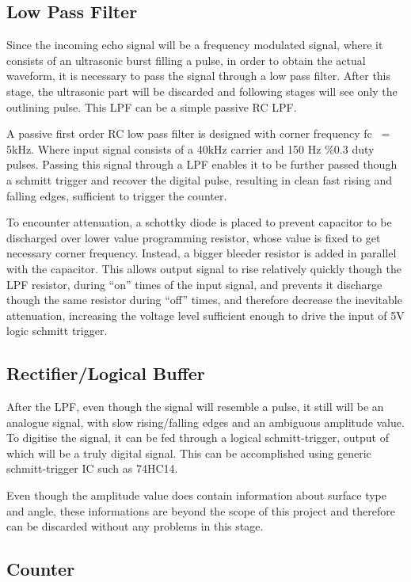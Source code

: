 \documentclass[12pt, a4paper]{article}
\begin{document}
	
	\subsection{Low Pass Filter}
	Since the incoming echo signal will be a frequency modulated signal, where it consists of an ultrasonic burst filling a pulse, in order to obtain the actual waveform, it is necessary to pass the signal through a low pass filter. After this stage, the ultrasonic part will be discarded and following stages will see only the outlining pulse. This LPF can be a simple passive RC LPF.
	
	A passive first order RC low pass filter is designed with corner frequency fc ~= 5kHz. Where input signal consists of a 40kHz carrier and 150 Hz \%0.3 duty pulses. Passing this signal through a LPF enables it to be further passed though a schmitt trigger and recover the digital pulse, resulting in clean fast rising and falling edges, sufficient to trigger the counter.

To encounter attenuation, a schottky diode is placed to prevent capacitor to be discharged over lower value programming resistor, whose value is fixed to get necessary corner frequency. Instead, a bigger bleeder resistor is added in parallel with the capacitor. This allows output signal to rise relatively quickly though the LPF resistor, during “on” times of the input signal, and prevents it discharge though the same resistor during “off” times, and therefore decrease the inevitable attenuation, increasing the voltage level sufficient enough to drive the input of 5V logic schmitt trigger.
	
	\subsection{Rectifier/Logical Buffer}
	After the LPF, even though the signal will resemble a pulse, it still will be an analogue signal, with slow rising/falling edges and an ambiguous amplitude value. To digitise the signal, it can be fed through a logical schmitt-trigger, output of which will be a truly digital signal. This can be accomplished using generic schmitt-trigger IC such as 74HC14.

	Even though the amplitude value does contain information about surface type and angle, these informations are beyond the scope of this project and therefore can be discarded without any problems in this stage.
	
	\subsection{Counter}
	
\end{document}
